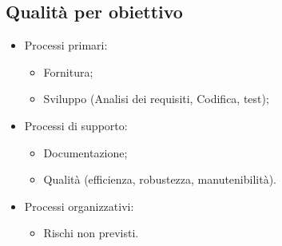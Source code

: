 \subsection{Qualità per obiettivo}

\begin{itemize}
  \item Processi primari:
    \begin{itemize}
      \item Fornitura;
      \item Sviluppo (Analisi dei requisiti, Codifica, test);
    \end{itemize}
  \item Processi di supporto:
    \begin{itemize}
      \item Documentazione;
      \item Qualità (efficienza, robustezza, manutenibilità).
    \end{itemize}
  \item Processi organizzativi:
    \begin{itemize}
      \item Rischi non previsti.
    \end{itemize}
\end{itemize}